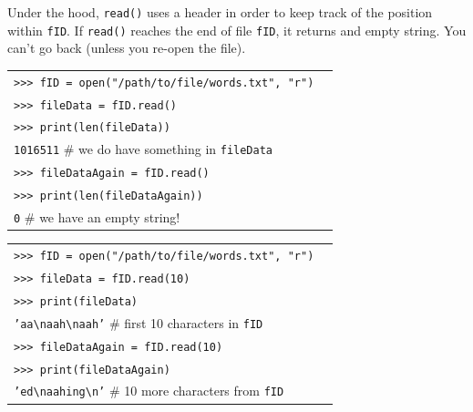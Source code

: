 \documentclass[t,handout,9pt]{beamer}
\begin{document}
%
\begin{frame}
\vfill
Under the hood, \texttt{read()} uses a header in order to keep track of the position within \texttt{fID}. If \texttt{read()} reaches the end of file \texttt{fID}, it returns and empty string. You can't go back (unless you re-open the file).
\vfill
\begin{table}[]
\begin{flushleft}
\begin{tabular}{ll}
\texttt{>{}>{}> fID = open("/path/to/file/words.txt", "r")} &  \\
\texttt{>{}>{}> fileData = fID.read()} &  \\
\texttt{>{}>{}> print(len(fileData))} &  \\
\texttt{1016511} \hfill \# we do have something in \texttt{fileData} &\\
\texttt{>{}>{}> fileDataAgain = fID.read()} &  \\
\texttt{>{}>{}> print(len(fileDataAgain))} &  \\
\texttt{0} \hfill \# we have an empty string! &  \\
\end{tabular}
\end{flushleft}
\end{table}
\begin{table}[]
\begin{flushleft}
\begin{tabular}{ll}
\texttt{>{}>{}> fID = open("/path/to/file/words.txt", "r")} &  \\
\texttt{>{}>{}> fileData = fID.read(10)} &  \\
\texttt{>{}>{}> print(fileData)} &  \\
\texttt{'aa\textbackslash naah\textbackslash naah'} \hfill \# first 10 characters in \texttt{fID} &\\
\texttt{>{}>{}> fileDataAgain = fID.read(10)} &  \\
\texttt{>{}>{}> print(fileDataAgain)} &  \\
\texttt{'ed\textbackslash naahing\textbackslash n'} \hfill \# 10 more characters from \texttt{fID} &  \\
\end{tabular}
\end{flushleft}
\end{table}
\vfill
\end{frame}
%
\end{document}
